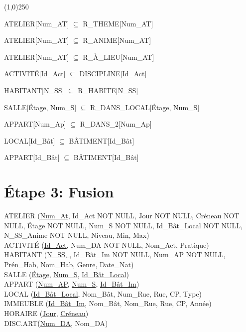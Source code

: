 \documentclass[a4paper,10.5pt]{report}
\begin{document}
	\begin{center}
	\line(1,0){250}
	\end{center}

	ATELIER[Num\_AT] $\subseteq$ R\_THEME[Num\_AT]

	ATELIER[Num\_AT] $\subseteq$ R\_ANIME[Num\_AT]

	ATELIER[Num\_AT] $\subseteq$ R\_À\_LIEU[Num\_AT]

	ACTIVITÉ[Id\_Act] $\subseteq$ DISCIPLINE[Id\_Act]

	HABITANT[N\_SS] $\subseteq$ R\_HABITE[N\_SS]

	SALLE[Étage, Num\_S] $\subseteq$ R\_DANS\_LOCAL[Étage, Num\_S]

	APPART[Num\_Ap] $\subseteq$ R\_DANS\_2[Num\_Ap]

	LOCAL[Id\_Bât] $\subseteq$ BÂTIMENT[Id\_Bât]

	APPART[Id\_Bât] $\subseteq$ BÂTIMENT[Id\_Bât]

    \section*{Étape 3: Fusion}

	ATELIER (\underline{Num\_At}, Id\_Act NOT NULL, Jour NOT NULL, Créneau NOT NULL, Étage NOT NULL, Num\_S NOT NULL, Id\_Bât\_Local NOT NULL, N\_SS\_Anime NOT NULL, Niveau, Min, Max) \\

	ACTIVITÉ (\underline{Id\_Act}, Num\_DA NOT NULL, Nom\_Act, Pratique) \\

	HABITANT (\underline{N\_SS, }, Id\_Bât\_Im NOT NULL, Num\_AP NOT NULL, Prén\_Hab, Nom\_Hab, Genre, Date\_Nat)  \\

	SALLE (\underline{Étage}, \underline{Num\_S}, \underline{Id\_Bât\_Local}) \\

	APPART (\underline{Num\_AP}, \underline{Num\_S}, \underline{Id\_Bât\_Im}) \\

	LOCAL (\underline{Id\_Bât\_Local}, Nom\_Bât, Num\_Rue, Rue, CP, Type) \\

	IMMEUBLE (\underline{Id\_Bât\_Im}, Nom\_Bât, Nom\_Rue, Rue, CP, Année) \\

	HORAIRE (\underline{Jour}, \underline{Créneau}) \\

	DISC.ART\. (\underline{Num\_DA}, Nom\_DA) \\
\end{document}

